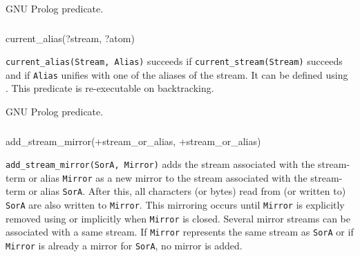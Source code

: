 \Portability

GNU Prolog predicate.

\subsubsection{}

\begin{TemplatesOneCol}
current\_alias(?stream, ?atom)

\end{TemplatesOneCol}

\Description

\texttt{current\_alias(Stream, Alias)} succeeds if
\texttt{current\_stream(Stream)} succeeds  and if
\texttt{Alias} unifies with one of the aliases of the stream. It can be
defined using  . This
predicate is re-executable on backtracking.

\begin{PlErrors}



\end{PlErrors}

\Portability

GNU Prolog predicate.

\subsubsection{\label{add-stream-mirror/2}}

\begin{TemplatesOneCol}
add\_stream\_mirror(+stream\_or\_alias, +stream\_or\_alias)

\end{TemplatesOneCol}

\Description

\texttt{add\_stream\_mirror(SorA, Mirror)} adds the stream associated with
the stream-term or alias \texttt{Mirror} as a new mirror to the stream
associated with the stream-term or alias \texttt{SorA}. After this, all
characters (or bytes) read from (or written to) \texttt{SorA} are also
written to \texttt{Mirror}. This mirroring occurs until \texttt{Mirror} is
explicitly removed using 
 or implicitly when \texttt{Mirror} is closed.
Several mirror streams can be associated with a same stream. If \texttt{Mirror}
represents the same stream as \texttt{SorA} or if \texttt{Mirror} is already
a mirror for \texttt{SorA}, no mirror is added.

